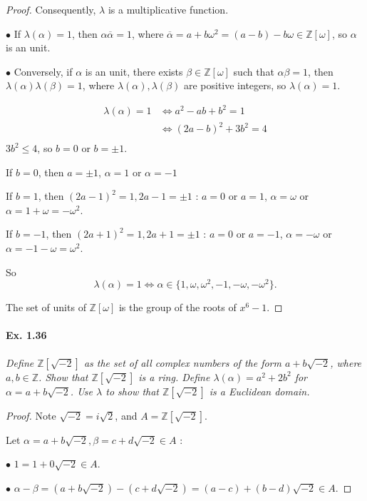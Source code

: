 \documentclass[11pt,a4paper]{article}
\newcommand{\Z}{\mathbb{Z}}
\begin{document}
{\begin{proof}
Consequently, $\lambda$ is a multiplicative function.

$\bullet$ If $\lambda(\alpha) = 1$, then $\alpha \overline{\alpha} = 1$, where $\overline{\alpha} = a+b\omega^2 = (a-b) -b\omega\in \Z[\omega]$, so $\alpha$ is an unit.

$\bullet$  Conversely, if $\alpha$ is an unit, there exists $\beta \in \Z[\omega]$ such that $\alpha \beta = 1$, then $\lambda( \alpha) \lambda(\beta) = 1$, where $\lambda(\alpha), \lambda(\beta)$ are positive integers, so $\lambda(\alpha) = 1$.

\begin{align*}
\lambda(\alpha) = 1 &\iff a^2 -ab +b^2 = 1\\
&\iff (2a-b)^2+3b^2 = 4\\
\end{align*}
$3b^2 \leq 4$, so $b=0$ or $b=\pm1$.

 If $b=0$, then $a = \pm 1$, $\alpha = 1$ or $\alpha = -1$

If $b = 1$, then $(2a-1)^2 = 1, 2a-1 = \pm 1$ : $a=0$ or $a=1$, $\alpha = \omega$ or $\alpha = 1+\omega = -\omega^2$.

If $b=-1$, then $(2a+1)^2 = 1, 2a+1 = \pm 1$ : $a = 0$ or $a=-1$, $\alpha= -\omega$ or $\alpha = -1-\omega = \omega^2$.

So
$$\lambda(\alpha) = 1 \iff \alpha \in \{1, \omega, \omega^2,-1,-\omega,-\omega^2\}.$$

The  set of units of $\Z[\omega]$ is the group of the roots of $x^6-1$.
\end{proof}

\paragraph{Ex. 1.36}

{\it Define $\Z[\sqrt{-2}]$ as the set of all complex numbers of the form $a+b\sqrt{-2}$, where $a,b\in \Z$. Show that $\Z[\sqrt{-2}]$ is a ring. Define $\lambda(\alpha) = a^2+2b^2$ for $\alpha = a+b\sqrt{-2}$. Use $\lambda$ to show that $\Z[\sqrt{-2}]$ is a Euclidean domain.
}

\begin{proof}
Note $\sqrt{-2} = i \sqrt{2}$, and $A = \Z[\sqrt{-2}]$.

Let $\alpha = a + b \sqrt{-2}, \beta =  c + d\sqrt{-2} \in A$ :

$\bullet$ $1 = 1 + 0 \sqrt{-2} \in A$.

$\bullet$ $\alpha - \beta = (a + b \sqrt{-2})- (c + d\sqrt{-2}) = (a-c) + (b-d) \sqrt{-2} \in A$.


\end{proof}}
\end{document}
